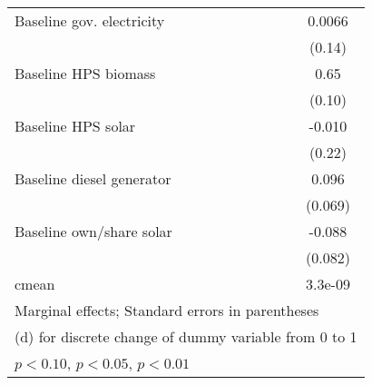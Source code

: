 \begin{table}[htbp]
\begin{tabular*}{1\hsize}{@{\hskip\tabcolsep\extracolsep\fill}l*{5}{c}}
Baseline gov. electricity&                  &                  &                  &                  &   0.0066         \\
                &                  &                  &                  &                  &   (0.14)         \\
Baseline HPS biomass&                  &                  &                  &                  &     0.65\sym{***}\\
                &                  &                  &                  &                  &   (0.10)         \\
Baseline HPS solar&                  &                  &                  &                  &   -0.010         \\
                &                  &                  &                  &                  &   (0.22)         \\
Baseline diesel generator&                  &                  &                  &                  &    0.096         \\
                &                  &                  &                  &                  &  (0.069)         \\
Baseline own/share solar&                  &                  &                  &                  &   -0.088         \\
                &                  &                  &                  &                  &  (0.082)         \\
\midrule
cmean           &                  &                  &                  &                  &  3.3e-09         \\
\bottomrule
\multicolumn{6}{l}{\footnotesize Marginal effects; Standard errors in parentheses}\\
\multicolumn{6}{l}{\footnotesize  (d) for discrete change of dummy variable from 0 to 1}\\
\multicolumn{6}{l}{\footnotesize \sym{*} \(p<0.10\), \sym{**} \(p<0.05\), \sym{***} \(p<0.01\)}\\
\end{tabular*}
\end{table}

